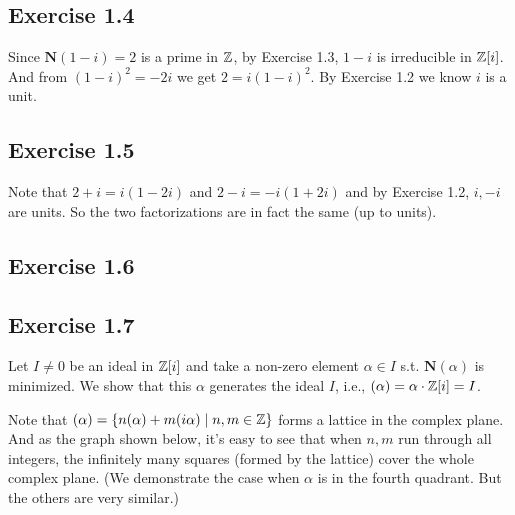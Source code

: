 \documentclass[../Marcus.tex]{subfiles}
\begin{document}
\subsection*{Exercise 1.4}

Since $\mathbf{N}(1-i)=2$ is a prime in $\mathbb{Z}$, by Exercise 1.3, $1-i$ is irreducible in $\mathbb{Z}[i]$. And from $(1-i)^2=-2i$ we get $2=i(1-i)^2$. By Exercise 1.2 we know $i$ is a unit.

\subsection*{Exercise 1.5}

Note that $2+i=i(1-2i)$ and $2-i=-i(1+2i)$ and by Exercise 1.2, $i,-i$ are units. So the two factorizations are in fact the same (up to units).

\subsection*{Exercise 1.6}

\subsection*{Exercise 1.7}
Let $I\neq 0$ be an ideal in $\mathbb{Z}[i]$ and take a non-zero element $\alpha\in I$ s.t. $\mathbf{N}(\alpha)$ is minimized. We show that this $\alpha$ generates the ideal $I$, i.e., $(\alpha)=\alpha\cdot\mathbb{Z}[i]=I$.

Note that $(\alpha)=\{n(\alpha)+m(i\alpha)\mid n,m\in\mathbb{Z}\}$ forms a lattice in the complex plane. And as the graph shown below, it's easy to see that when $n,m$ run through all integers, the infinitely many squares (formed by the lattice) cover the whole complex plane. (We demonstrate the case when $\alpha$ is in the fourth quadrant. But the others are very similar.)

\begin{center}
\end{center}
\end{document}
